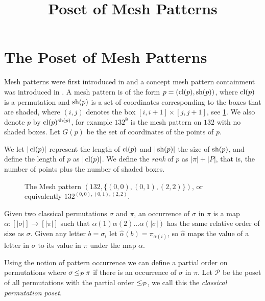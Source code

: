 \documentclass[11pt,a4paper,oneside]{article}
\title{Poset of Mesh Patterns}
\begin{document}
	\maketitle


\section{The Poset of Mesh Patterns}

Mesh patterns were first introduced in \cite{Bra11} and a concept mesh pattern containment was introduced in \cite{TU17}. A mesh pattern is of the form $p=(\operatorname{\textrm{cl}}(p),\operatorname{\textrm{sh}}(p))$, where $\operatorname{\textrm{cl}}(p)$ is a permutation and $\operatorname{\textrm{sh}}(p)$ is a set of coordinates corresponding to the boxes that are shaded, where $(i,j)$ denotes the box $[i,i+1]\times[j,j+1]$, see \cref{fig:132}. We also denote $p$ by $\operatorname{\textrm{cl}}(p)^{\operatorname{\textrm{sh}}(p)}$, for example $132^\emptyset$ is the mesh pattern on $132$ with no shaded boxes. Let $G(p)$ be the set of coordinates of the points of $p$.

We let $|\operatorname{\textrm{cl}}(p)|$ represent the length of $\operatorname{\textrm{cl}}(p)$ and $|\operatorname{\textrm{sh}}(p)|$ the size of $\operatorname{\textrm{sh}}(p)$, and define the length of $p$ as $|\operatorname{\textrm{cl}}(p)|$. We define the \emph{rank} of $p$ as $|\pi|+|P|$, that is, the number of points plus the number of shaded boxes.


\begin{figure}\centering{}
\caption{The Mesh pattern $(132,\{(0,0),(0,1),(2,2)\})$, or equivalently $132^{(0,0),(0,1),(2,2)}$.}\label{fig:132}\end{figure}

Given two classical permutations $\sigma$ and $\pi$, an occurrence of $\sigma$ in $\pi$ is a map $\alpha:[|\sigma|]\rightarrow[|\pi|]$ such that $\alpha(1)\alpha(2)\ldots\alpha(|\sigma|)$ has the same relative order of size as $\sigma$. Given any letter $b=\sigma_i$ let $\hat{\alpha}(b)=\pi_{\alpha(i)}$, so $\hat{\alpha}$ maps the value of a letter in $\sigma$ to its value in $\pi$ under the map $\alpha$.

Using the notion of pattern occurrence we can define a partial order on permutations where $\sigma\operatorname{\le_{\mathcal{P}}}\pi$ if there is an occurrence of $\sigma$ in $\pi$. Let $\mathcal{P}$ be the poset of all permutations with the partial order $\operatorname{\le_{\mathcal{P}}}$, we call this the \emph{classical permutation poset}.
\end{document}

